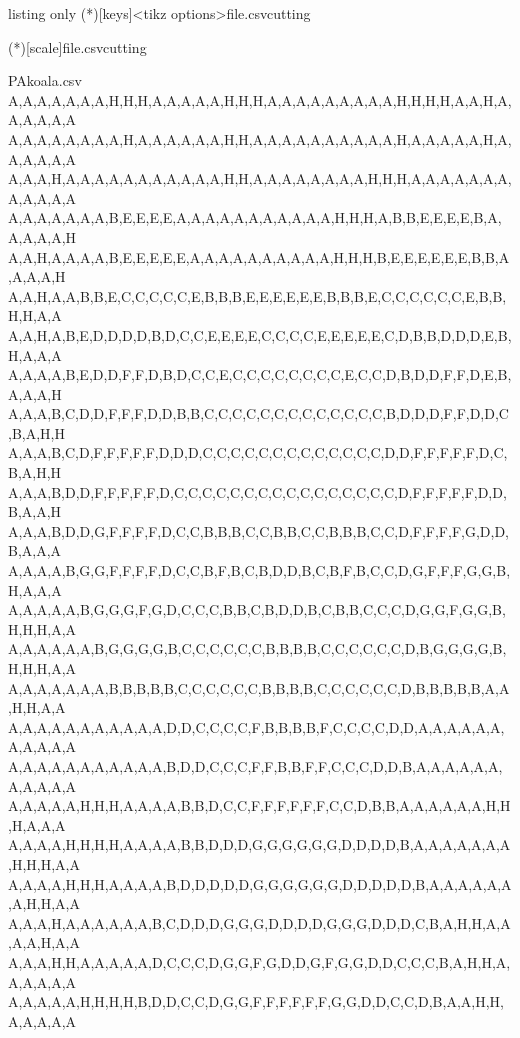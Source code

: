 \documentclass{article}
\begin{document}
\begin{PresentationCode}{listing only}
\CutPixlArtTikz(*)[keys]<tikz options>{file.csv}{cutting}

\HelpGridPixelArtTikz(*)[scale]{file.csv}{cutting}
\end{PresentationCode}

\begin{filecontents*}[overwrite]{PAkoala.csv}
A,A,A,A,A,A,A,H,H,H,A,A,A,A,A,H,H,H,A,A,A,A,A,A,A,A,A,H,H,H,H,A,A,H,A,A,A,A,A,A
A,A,A,A,A,A,A,A,H,A,A,A,A,A,A,H,H,A,A,A,A,A,A,A,A,A,A,H,A,A,A,A,A,H,A,A,A,A,A,A
A,A,A,H,A,A,A,A,A,A,A,A,A,A,A,H,H,A,A,A,A,A,A,A,A,H,H,H,A,A,A,A,A,A,A,A,A,A,A,A
A,A,A,A,A,A,A,B,E,E,E,E,A,A,A,A,A,A,A,A,A,A,A,H,H,H,A,B,B,E,E,E,E,B,A,A,A,A,A,H
A,A,H,A,A,A,A,B,E,E,E,E,E,A,A,A,A,A,A,A,A,A,A,H,H,H,B,E,E,E,E,E,E,B,B,A,A,A,A,H
A,A,H,A,A,B,B,E,C,C,C,C,C,E,B,B,B,E,E,E,E,E,E,B,B,B,E,C,C,C,C,C,C,E,B,B,H,H,A,A
A,A,H,A,B,E,D,D,D,D,B,D,C,C,E,E,E,E,C,C,C,C,E,E,E,E,E,C,D,B,B,D,D,D,E,B,H,A,A,A
A,A,A,A,B,E,D,D,F,F,D,B,D,C,C,E,C,C,C,C,C,C,C,C,E,C,C,D,B,D,D,F,F,D,E,B,A,A,A,H
A,A,A,B,C,D,D,F,F,F,D,D,B,B,C,C,C,C,C,C,C,C,C,C,C,C,C,B,D,D,D,F,F,D,D,C,B,A,H,H
A,A,A,B,C,D,F,F,F,F,F,D,D,D,C,C,C,C,C,C,C,C,C,C,C,C,C,D,D,F,F,F,F,F,D,C,B,A,H,H
A,A,A,B,D,D,F,F,F,F,F,D,C,C,C,C,C,C,C,C,C,C,C,C,C,C,C,C,D,F,F,F,F,F,D,D,B,A,A,H
A,A,A,B,D,D,G,F,F,F,F,D,C,C,B,B,B,C,C,B,B,C,C,B,B,B,C,C,D,F,F,F,F,G,D,D,B,A,A,A
A,A,A,A,B,G,G,F,F,F,F,D,C,C,B,F,B,C,B,D,D,B,C,B,F,B,C,C,D,G,F,F,F,G,G,B,H,A,A,A
A,A,A,A,A,B,G,G,G,F,G,D,C,C,C,B,B,C,B,D,D,B,C,B,B,C,C,C,D,G,G,F,G,G,B,H,H,H,A,A
A,A,A,A,A,A,B,G,G,G,G,B,C,C,C,C,C,C,B,B,B,B,C,C,C,C,C,C,D,B,G,G,G,G,B,H,H,H,A,A
A,A,A,A,A,A,A,B,B,B,B,B,C,C,C,C,C,C,B,B,B,B,C,C,C,C,C,C,D,B,B,B,B,B,A,A,H,H,A,A
A,A,A,A,A,A,A,A,A,A,A,D,D,C,C,C,C,F,B,B,B,B,F,C,C,C,C,D,D,A,A,A,A,A,A,A,A,A,A,A
A,A,A,A,A,A,A,A,A,A,A,B,D,D,C,C,C,F,F,B,B,F,F,C,C,C,D,D,B,A,A,A,A,A,A,A,A,A,A,A
A,A,A,A,A,H,H,H,A,A,A,A,B,B,D,C,C,F,F,F,F,F,F,C,C,D,B,B,A,A,A,A,A,A,H,H,H,A,A,A
A,A,A,A,H,H,H,H,A,A,A,A,B,B,D,D,D,G,G,G,G,G,G,D,D,D,D,B,A,A,A,A,A,A,A,H,H,H,A,A
A,A,A,A,H,H,H,A,A,A,A,B,D,D,D,D,D,G,G,G,G,G,G,D,D,D,D,D,B,A,A,A,A,A,A,A,H,H,A,A
A,A,A,H,A,A,A,A,A,A,B,C,D,D,D,G,G,G,D,D,D,D,G,G,G,D,D,D,C,B,A,H,H,A,A,A,A,H,A,A
A,A,A,H,H,A,A,A,A,A,D,C,C,C,D,G,G,F,G,D,D,G,F,G,G,D,D,C,C,C,B,A,H,H,A,A,A,A,A,A
A,A,A,A,A,H,H,H,H,B,D,D,C,C,D,G,G,F,F,F,F,F,F,G,G,D,D,C,C,D,B,A,A,H,H,A,A,A,A,A

\end{filecontents*}
\end{document}
